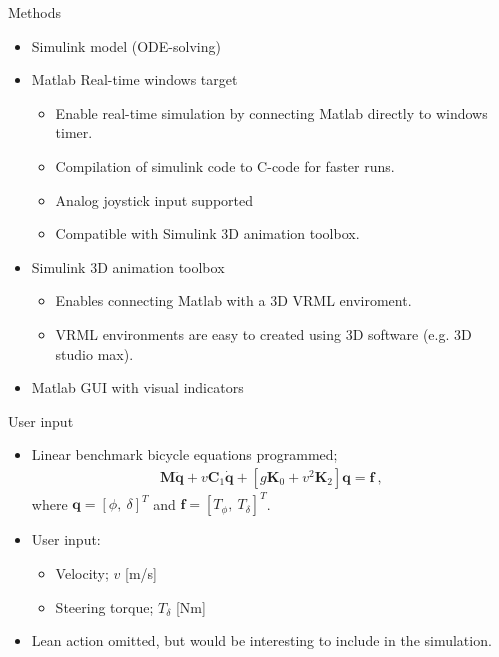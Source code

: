 \documentclass{beamer}
\begin{document}
\begin{frame}{Methods}
		\begin{itemize}
		\item Simulink model (ODE-solving)
		\item Matlab Real-time windows target
				\begin{itemize}
				\item Enable real-time simulation by connecting Matlab directly to windows timer.
				\item Compilation of simulink code to C-code for faster runs.
				\item Analog joystick input supported
				\item Compatible with Simulink 3D animation toolbox.
				\end{itemize}
		\item Simulink 3D animation toolbox
				\begin{itemize}
						\item Enables connecting Matlab with a 3D VRML enviroment.
						\item VRML environments are easy to created using 3D software (e.g. 3D studio max).
				\end{itemize}
		\item Matlab GUI with visual indicators
		\end{itemize}
\end{frame}

\begin{frame}{User input}
		\begin{itemize}
		\item Linear benchmark bicycle equations programmed;
		\begin{align} 
		\mathbf{M}\ddot{\mathbf{q}} + v\mathbf{C}_1\dot{\mathbf{q} } + \left[g\mathbf{K}_0 + v^2\mathbf{K}_2\right]\mathbf{q} = \mathbf{f} \ ,
		\end{align}
		where $\mathbf{q} = \left[\phi , \ \delta \right]^T$ and $\mathbf{f} = \left[ T_\phi , \ T_\delta \right]^T$.
		\item User input:
				\begin{itemize}
				\item Velocity; $v$ [m/s]
				\item Steering torque; $T_{\delta}$ [Nm]
				\end{itemize}
		\item Lean action omitted, but would be interesting to include in the simulation.
		\end{itemize}
\end{frame}
\end{document}
